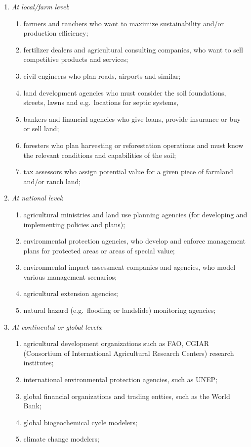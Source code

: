 \documentclass[graybox,natbib,nospthms,UStrade]{svmono}
\begin{document}
\begin{enumerate}
\def\labelenumi{\arabic{enumi}.}
\item
  \emph{At local/farm level}:

  \begin{enumerate}
  \def\labelenumii{\arabic{enumii}.}
  \item
    farmers and ranchers who want to maximize sustainability and/or production efficiency;
  \item
    fertilizer dealers and agricultural consulting companies, who want to sell competitive products and services;
  \item
    civil engineers who plan roads, airports and similar;
  \item
    land development agencies who must consider the soil
    foundations, streets, lawns and e.g.~locations for septic
    systems,
  \item
    bankers and financial agencies who give loans, provide insurance
    or buy or sell land;
  \item
    foresters who plan harvesting or reforestation operations and must know the
    relevant conditions and capabilities of the soil;
  \item
    tax assessors who assign potential value for a given piece of farmland
    and/or ranch land;
  \end{enumerate}
\item
  \emph{At national level}:

  \begin{enumerate}
  \def\labelenumii{\arabic{enumii}.}
  \item
    agricultural ministries and land use planning agencies (for
    developing and implementing policies and plans);
  \item
    environmental protection agencies, who develop and enforce management plans
    for protected areas or areas of special value;
  \item
    environmental impact assessment companies and agencies, who model
    various management scenarios;
  \item
    agricultural extension agencies;
  \item
    natural hazard (e.g.~flooding or landslide) monitoring agencies;
  \end{enumerate}
\item
  \emph{At continental or global levels}:

  \begin{enumerate}
  \def\labelenumii{\arabic{enumii}.}
  \item
    agricultural development organizations such as FAO, CGIAR (Consortium of
    International Agricultural Research Centers) research
    institutes;
  \item
    international environmental protection agencies, such as UNEP;
  \item
    global financial organizations and trading entties, such as the World Bank;
  \item
    global biogeochemical cycle modelers;
  \item
    climate change modelers;
  \end{enumerate}
\end{enumerate}
\end{document}
